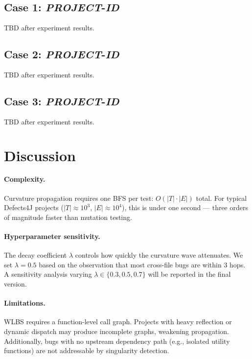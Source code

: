 \documentclass[acmtog]{acmart}
\begin{document}
\subsection*{Case 1: \textit{PROJECT}-\textit{ID}}
TBD after experiment results.

\subsection*{Case 2: \textit{PROJECT}-\textit{ID}}
TBD after experiment results.

\subsection*{Case 3: \textit{PROJECT}-\textit{ID}}
TBD after experiment results.

\section{Discussion}\label{sec:discussion}

\paragraph{Complexity.} Curvature propagation requires one BFS per test:
$O(|T| \cdot |E|)$ total. For typical Defects4J projects ($|T| \approx
10^3$, $|E| \approx 10^4$), this is under one second — three orders of
magnitude faster than mutation testing.

\paragraph{Hyperparameter sensitivity.} The decay coefficient $\lambda$
controls how quickly the curvature wave attenuates. We set $\lambda = 0.5$
based on the observation that most cross-file bugs are within 3 hops. A
sensitivity analysis varying $\lambda \in \{0.3, 0.5, 0.7\}$ will be
reported in the final version.

\paragraph{Limitations.} WLBS requires a function-level call graph. Projects
with heavy reflection or dynamic dispatch may produce incomplete graphs,
weakening propagation. Additionally, bugs with no upstream dependency path
(e.g., isolated utility functions) are not addressable by singularity detection.
\end{document}
